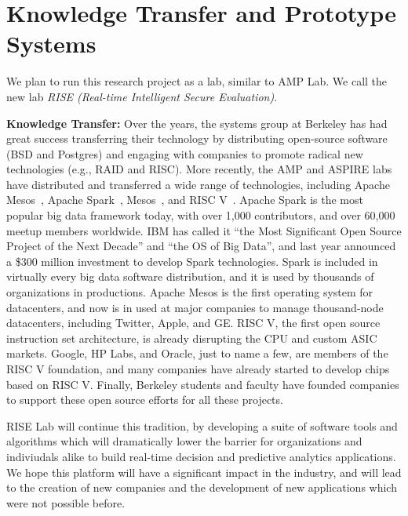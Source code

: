 \section{Knowledge Transfer and Prototype Systems}

We plan to run this research project as a lab, similar to AMP Lab. We call the new lab {\em RISE (Real-time Intelligent Secure Evaluation)}. 

{\bf Knowledge Transfer:} Over the years, the systems group at Berkeley has had great success transferring their technology by distributing open-source software (\eg BSD and Postgres) and engaging with companies to promote radical new technologies (e.g., RAID and RISC).  More recently, the AMP and ASPIRE labs have distributed and transferred a wide range of technologies, including Apache Mesos~\cite{mesos}, Apache Spark~\cite{spark}, Mesos~\cite{mesos}, and RISC V~\cite{risc-v}. Apache Spark is the most popular big data framework today, with over 1,000 contributors, and over 60,000 meetup members worldwide. IBM has called it ``the Most Significant Open Source Project of the Next Decade'' and ``the OS of Big Data'', and last year announced a \$300 million investment to develop Spark technologies. Spark is included in virtually every big data software distribution, and it is used by thousands of organizations in productions. Apache Mesos is the first operating system for datacenters, and now is in used at major companies to manage thousand-node datacenters, including Twitter, Apple, and GE.  RISC V, the first open source instruction set architecture, is already disrupting the CPU and custom ASIC markets. Google, HP Labs, and Oracle, just to name a few, are members of the RISC V foundation, and many companies have already started to develop chips based on RISC V. Finally, Berkeley students and faculty have founded companies to support these open source efforts for all these projects.

RISE Lab will continue this tradition, by developing a suite of software tools and algorithms which will dramatically lower the barrier for organizations and indiviudals alike to build real-time decision and predictive analytics applications. We hope this platform will have a significant impact in the industry, and will lead to the creation of new companies and the development of new applications which were not possible before.


